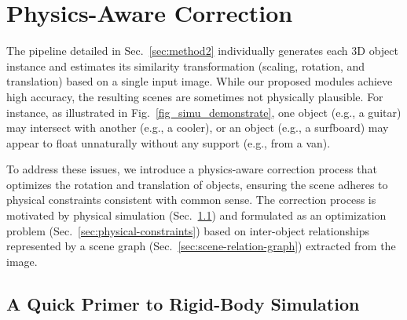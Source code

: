 


\section{Physics-Aware Correction}
\label{sec:physics-aware-correction}

The pipeline detailed in Sec.~\ref{sec:method2} individually generates each 3D object instance and estimates its similarity transformation (scaling, rotation, and translation) based on a single input image. While our proposed modules achieve high accuracy, the resulting scenes are sometimes not physically plausible. For instance, as illustrated in Fig.~\ref{fig_simu_demonstrate}, one object (e.g., a guitar) may intersect with another (e.g., a cooler), or an object (e.g., a surfboard) may appear to float unnaturally without any support (e.g., from a van). 

To address these issues, we introduce a physics-aware correction process that optimizes the rotation and translation of objects, ensuring the scene adheres to physical constraints consistent with common sense.
The correction process is motivated by physical simulation (Sec.~\ref{sec:rigid-body-sim}) and formulated as an optimization problem (Sec.~\ref{sec:physical-constraints}) based on inter-object relationships represented by a scene graph (Sec.~\ref{sec:scene-relation-graph}) extracted from the image.

\subsection{A Quick Primer to Rigid-Body Simulation}
\label{sec:rigid-body-sim}


